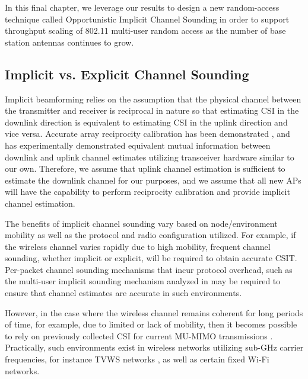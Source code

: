 
	In this final chapter, we leverage our results to design a new random-access technique called Opportunistic Implicit Channel Sounding in order to support throughput scaling of 802.11 multi-user random access as the number of base station antennas continues to grow.
	
\subsection{Implicit vs. Explicit Channel Sounding}
\label{sec_im_vs_exp}

 Implicit beamforming relies on the assumption that the physical channel between the transmitter and receiver is reciprocal in nature so that estimating \ac{CSI} in the downlink direction is equivalent to estimating \ac{CSI} in the uplink direction and vice versa.
 Accurate array reciprocity calibration has been demonstrated \cite{shepard2012argos}, and \cite{guillaud2013reciprocity} has experimentally demonstrated equivalent mutual information between downlink and uplink channel estimates utilizing transceiver hardware similar to our own.
 Therefore, we assume that uplink channel estimation is sufficient to estimate the downlink channel for our purposes, and we assume that all new \acp{AP} will have the capability to perform reciprocity calibration and provide implicit channel estimation.
 
 The benefits of implicit channel sounding vary based on node/environment mobility as well as the protocol and radio configuration utilized.
For example, if the wireless channel varies rapidly due to high mobility, frequent channel sounding, whether implicit or explicit, will be required to obtain accurate \ac{CSIT}.
 Per-packet channel sounding mechanisms that incur protocol overhead, such as the multi-user implicit sounding mechanism analyzed in \cite{lou2013comparison} may be required to ensure that channel estimates are accurate in such environments.

However, in the case where the wireless channel remains coherent for long periods of time, for example, due to limited or lack of mobility, then it becomes possible to rely on previously collected \ac{CSI} for current \ac{MU-MIMO} transmissions \cite{bejarano2014mute, xie2013adaptive}.
Practically, such environments exist in wireless networks utilizing sub-GHz carrier frequencies, for instance \ac{TVWS} networks \cite{anand2014case}, as well as certain fixed Wi-Fi networks.


